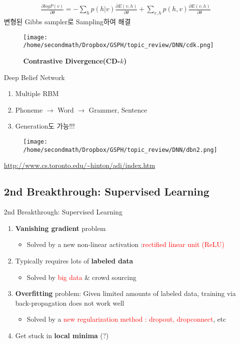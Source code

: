 \documentclass{beamer}
\begin{document}
\begin{frame}
\begin{align*}
\frac{\partial logP(v)}{\partial \theta}=-\sum_{h} p(h|v) \frac{\partial E(v,h)}{\partial \theta} + \sum_{v,h} p(h,v)\frac{\partial E(v,h)}{\partial \theta} 
\end{align*}
변형된 Gibbs sampler로 Sampling하여 해결 
\end{frame}


\begin{frame}
\begin{figure}[!ht]
\centering
\texttt{[image: /home/secondmath/Dropbox/GSPH/topic\_review/DNN/cdk.png]}
\caption{\bf{Contrastive Divergence(CD-$k$)\citep{fischer2012introduction}}}
\label{cdk}
\end{figure}
\end{frame}

\begin{frame}{Deep Belief Network\citep{hinton2006fast,hinton2009deep,bengio2009learning}}
\begin{enumerate}
  \item Multiple RBM
  \item Phoneme $\rightarrow$ Word $\rightarrow$ Grammer, Sentence
  \item Generation도 가능!!! 
\end{enumerate}
\begin{figure}[!ht]
\centering
\texttt{[image: /home/secondmath/Dropbox/GSPH/topic\_review/DNN/dbn2.png]}
\end{figure}
 \url{http://www.cs.toronto.edu/~hinton/adi/index.htm}
\end{frame}


\subsection{2nd Breakthrough: Supervised Learning} 
\begin{frame}{2nd Breakthrough: Supervised Learning}
\begin{enumerate}
\item \textbf{Vanishing gradient} problem
\begin{itemize}
  \item Solved by a new non-linear activation :\textcolor{red}{rectified linear unit (ReLU)}
\end{itemize}
\item Typically requires lots of \textbf{labeled data}
\begin{itemize}
  \item Solved by \textcolor{red}{big data} \& crowd sourcing
\end{itemize}
\item \textbf{Overfitting} problem: Given limited amounts of labeled data, training via back-propagation does not work well
\begin{itemize}
  \item Solved by a \textcolor{red}{new regularization method : dropout, dropconnect}, etc
\end{itemize}
\item Get stuck in \textbf{local minima} (?)
\end{enumerate} 
\end{frame}
\end{document}
